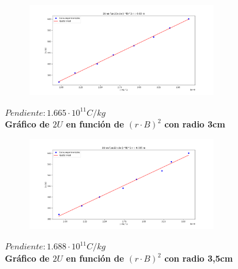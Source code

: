 \documentclass[a4paper]{article}
\begin{document}
    \newpage
    \noindent
    \thispagestyle{fancy}

    \begin{figure}[h!]
        \centering
        \vspace{-2mm}
        \includegraphics[width = 8cm] {../imagenes/radio3.png}
        \vspace{-5mm}
    \end{figure}

    \begin{center}
        \textbf{$Pendiente: 1.665 \cdot 10^{11} C/kg$} \\
        \textbf{Gráfico de $2U$ en función de $(r \cdot B)^2$ con radio 3cm} \\
    \end{center}

    \begin{figure}[h!]
        \centering
        \vspace{-2mm}
        \includegraphics[width = 8cm] {../imagenes/radio3,5.png}
        \vspace{-5mm}
    \end{figure}

    \begin{center}
        \textbf{$Pendiente: 1.688 \cdot 10^{11} C/kg$} \\
        \textbf{Gráfico de $2U$ en función de $(r \cdot B)^2$ con radio 3,5cm} \\
    \end{center}
\end{document}
